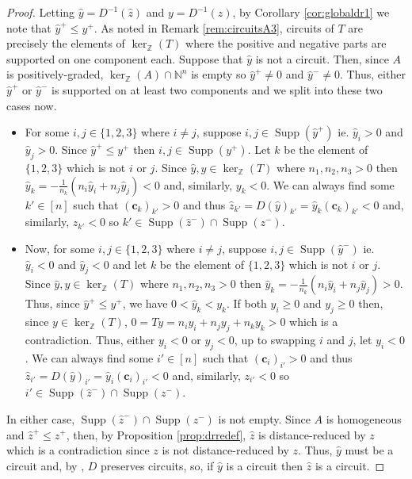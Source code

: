 \documentclass[a4paper, 12pt]{article}
\newcommand{\NN}{\mathbb N}
\newcommand{\ZZ}{\mathbb Z}
\theoremstyle{plain}
\theoremstyle{definition}
\theoremstyle{remark}
\begin{document}
\begin{proof}
    Letting $\hat y =D^{-1}(\hat z)$ and $y=D^{-1}(z)$, by Corollary \ref{cor:globaldr1} we note that $\hat y^+ \le y^+$. As noted in Remark \ref{rem:circuitsA3}, circuits of $T$ are precisely the elements of $\ker_\ZZ(T)$ where the positive and negative parts are supported on one component each. Suppose that $\hat y$ is not a circuit. Then,  since $A$ is positively-graded, $\ker_\ZZ(A) \cap \NN^n$ is empty so $\hat y^+ \neq 0$ and $\hat y^- \neq 0$. Thus, either $\hat y^+$ or $\hat y^-$ is supported on at least two components and we split into these two cases now. 

    \begin{itemize}
        \item For some $i,j \in \{1,2,3\}$ where $i \neq j$, suppose $i,j \in \operatorname{Supp}(\hat y^+)$  ie. $\hat y_i>0$ and $\hat y_j>0$. Since $\hat y^+ \le y^+$ then $i,j \in \operatorname{Supp}(y^+)$. Let $k$ be the element of $\{1,2,3\}$ which is not $i$ or $j$. Since $\hat y,y \in \ker_\ZZ(T)$ where $n_1,n_2,n_3 >0$ then $\hat y_k=-\frac{1}{n_k}(n_i \hat y_i + n_j \hat y_j)<0$ and, similarly, $y_k<0$. We can always find some $k' \in [n]$ such that $(\mathbf{c}_k)_{k'}>0$ and thus $\hat z_{k'}=D(\hat y)_{k'}=\hat y_k (\mathbf{c}_k)_{k'}<0$ and, similarly, $z_{k'}<0$ so $k' \in \operatorname{Supp}(\hat z^-) \cap \operatorname{Supp}(z^-)$. 
        \item Now, for some $i,j \in \{1,2,3\}$ where $i \neq j$, suppose $i,j \in \operatorname{Supp}(\hat y^-)$  ie. $\hat y_i<0$ and $\hat y_j<0$ and let $k$ be the element of $\{1,2,3\}$ which is not $i$ or $j$. Since $\hat y,y \in \ker_\ZZ(T)$ where $n_1,n_2,n_3 >0$ then $\hat y_k=-\frac{1}{n_k}(n_i \hat y_i + n_j \hat y_j)>0$. Thus, since $\hat y^+ \le y^+$, we have $0< \hat y_k<y_k$. If both $y_i\ge 0$ and $y_j\ge 0$ then, since $y \in \ker_\ZZ(T)$, $0=Ty=n_iy_i+n_jy_j+n_ky_k>0$ which is a contradiction. Thus, either $y_i<0$ or $y_j<0$, up to swapping $i$ and $j$, let $y_i<0$. We can always find some $i' \in [n]$ such that $(\mathbf{c}_i)_{i'}>0$ and thus $\hat z_{i'}=D(\hat y)_{i'}=\hat y_i (\mathbf{c}_i)_{i'}<0$ and, similarly, $z_{i'}<0$ so $i' \in \operatorname{Supp}(\hat z^-) \cap \operatorname{Supp}(z^-)$.
    \end{itemize}

    In either case, $\operatorname{Supp}(\hat z^-) \cap \operatorname{Supp}(z^-)$ is not empty. Since $A$ is homogeneous and $\hat z^+ \le z^+$, then, by Proposition \ref{prop:drredef}, $\hat z$ is distance-reduced by $z$ which is a contradiction since $z$ is not distance-reduced by $z$. Thus, $\hat y$ must be a circuit and, by \cite[Theorem 1.11]{petrovic2018bouquet}, $D$ preserves circuits, so, if $\hat y$ is a circuit then $\hat z$ is a circuit.
    

\end{proof}
\end{document}
